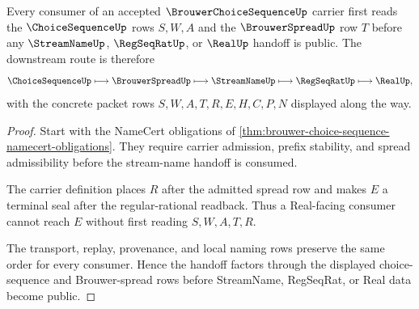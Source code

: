 \begin{theorem}
\label{thm:brouwer-choice-sequence-spread-stream-handoff}
Every consumer of an accepted $\BrouwerChoiceSequenceUp$ carrier first reads the $\ChoiceSequenceUp$ rows $S,W,A$ and the $\BrouwerSpreadUp$ row $T$ before any $\StreamNameUp$, $\RegSeqRatUp$, or $\RealUp$ handoff is public. The downstream route is therefore
$$
\ChoiceSequenceUp \longmapsto \BrouwerSpreadUp \longmapsto \StreamNameUp \longmapsto \RegSeqRatUp \longmapsto \RealUp ,
$$
with the concrete packet rows $S,W,A,T,R,E,H,C,P,N$ displayed along the way.
\end{theorem}
\begin{proof}
Start with the NameCert obligations of \autoref{thm:brouwer-choice-sequence-namecert-obligations}. They require carrier admission, prefix stability, and spread admissibility before the stream-name handoff is consumed.

The carrier definition places $R$ after the admitted spread row and makes $E$ a terminal seal after the regular-rational readback. Thus a Real-facing consumer cannot reach $E$ without first reading $S,W,A,T,R$.

The transport, replay, provenance, and local naming rows preserve the same order for every consumer. Hence the handoff factors through the displayed choice-sequence and Brouwer-spread rows before StreamName, RegSeqRat, or Real data become public.
\end{proof}




